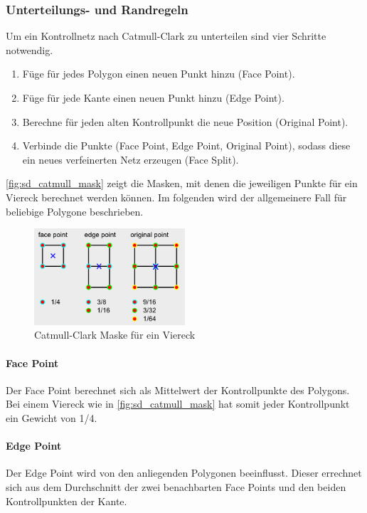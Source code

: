 \subsubsection*{Unterteilungs- und Randregeln}

Um ein Kontrollnetz nach Catmull-Clark zu unterteilen sind vier Schritte notwendig.
\begin{enumerate}
	\item Füge für jedes Polygon einen neuen Punkt hinzu (Face Point).
	\item Füge für jede Kante einen neuen Punkt hinzu (Edge Point).
	\item Berechne für jeden alten Kontrollpunkt die neue Position (Original Point).
	\item Verbinde die Punkte (Face Point, Edge Point, Original Point), sodass diese ein
	neues verfeinerten Netz erzeugen (Face Split).
\end{enumerate}

\autoref{fig:sd_catmull_mask} zeigt die Masken, mit denen die jeweiligen Punkte für ein Viereck berechnet werden können.
Im folgenden wird der allgemeinere Fall für beliebige Polygone beschrieben.
\begin{figure}
\centering
\includegraphics[width=0.5\textwidth]{content/media/sd_catmull_mask.png}
\caption{Catmull-Clark Maske für ein Viereck \cite{yoshihitoyagi.23.12.2015}}
\label{fig:sd_catmull_mask}
\end{figure}

\paragraph*{Face Point}
Der Face Point berechnet sich als Mittelwert der Kontrollpunkte des Polygons.
Bei einem Viereck wie in \autoref{fig:sd_catmull_mask} hat somit jeder Kontrollpunkt
ein Gewicht von 1/4.

\paragraph*{Edge Point}
Der Edge Point wird von den anliegenden Polygonen beeinflusst.
Dieser errechnet sich aus dem Durchschnitt der zwei benachbarten Face Points und den
beiden Kontrollpunkten der Kante.

